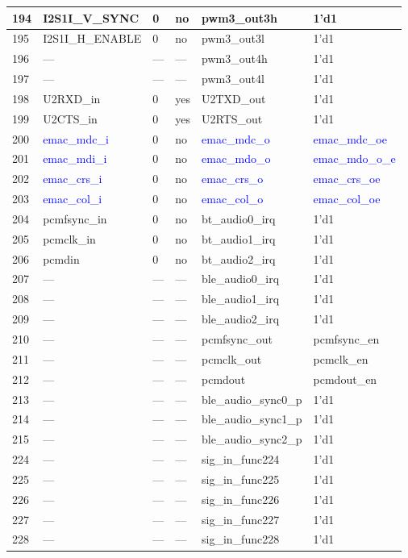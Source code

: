 \begin{longtable}[c]{|p{1cm}|p{3.3cm}|p{1.5cm}|p{2.4cm}|p{4.3cm}|p{2.5cm}| }
    194 & I2S1I\_V\_SYNC & 0 & no & pwm3\_out3h & 1'd1 \\ \hline
    195 & I2S1I\_H\_ENABLE & 0 & no & pwm3\_out3l & 1'd1 \\ \hline
    196 & --- & --- & --- & pwm3\_out4h & 1'd1 \\ \hline
    197 & --- & --- & --- & pwm3\_out4l & 1'd1 \\ \hline
    198 & U2RXD\_in & 0 & yes & U2TXD\_out & 1'd1 \\ \hline
    199 & U2CTS\_in & 0 & yes & U2RTS\_out & 1'd1 \\ \hline
    200 &  \textcolor{blue}{ emac\_mdc\_i} & 0 & no & \textcolor{blue}{emac\_mdc\_o} &  \textcolor{blue}{emac\_mdc\_oe} \\ \hline
    201 &  \textcolor{blue}{emac\_mdi\_i} & 0 & no &  \textcolor{blue}{emac\_mdo\_o} &  \textcolor{blue}{emac\_mdo\_o\_e} \\ \hline
    202 &  \textcolor{blue}{emac\_crs\_i} & 0 & no &  \textcolor{blue}{emac\_crs\_o} &  \textcolor{blue}{emac\_crs\_oe} \\ \hline
    203 &  \textcolor{blue}{emac\_col\_i} & 0 & no &  \textcolor{blue}{emac\_col\_o} &  \textcolor{blue}{emac\_col\_oe} \\ \hline
    204 & pcmfsync\_in & 0 & no & bt\_audio0\_irq & 1'd1 \\ \hline
    205 & pcmclk\_in & 0 & no & bt\_audio1\_irq & 1'd1 \\ \hline
    206 & pcmdin & 0 & no & bt\_audio2\_irq & 1'd1 \\ \hline
    207 & --- & --- & --- & ble\_audio0\_irq & 1'd1 \\ \hline
    208 & --- & --- & --- & ble\_audio1\_irq & 1'd1 \\ \hline
    209 & --- & --- & --- & ble\_audio2\_irq & 1'd1 \\ \hline
    210 & --- & --- & --- & pcmfsync\_out & pcmfsync\_en \\ \hline
    211 & --- & --- & --- & pcmclk\_out & pcmclk\_en \\ \hline
    212 & --- & --- & --- & pcmdout & pcmdout\_en \\ \hline
    213 & --- & --- & --- & ble\_audio\_sync0\_p & 1'd1 \\ \hline
    214 & --- & --- & --- & ble\_audio\_sync1\_p & 1'd1 \\ \hline
    215 & --- & --- & --- & ble\_audio\_sync2\_p & 1'd1 \\ \hline
    224 & --- & --- & --- & sig\_in\_func224 & 1'd1 \\ \hline
    225 & --- & --- & --- & sig\_in\_func225 & 1'd1 \\ \hline
    226 & --- & --- & --- & sig\_in\_func226 & 1'd1 \\ \hline
    227 & --- & --- & --- & sig\_in\_func227 & 1'd1 \\ \hline
    228 & --- & --- & --- & sig\_in\_func228 & 1'd1 \\ \hline
    
    \end{longtable}